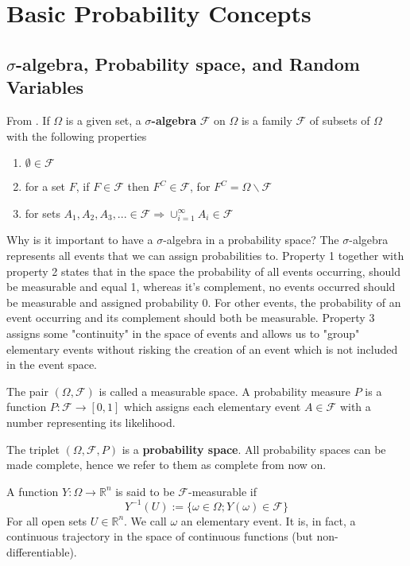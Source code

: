 \documentclass[12pt]{report}
\begin{document}
\tableofcontents
\chapter{Basic Probability Concepts}
\section{$\sigma$-algebra, Probability space, and Random Variables}
From \cite{Oksendal14}. If $\Omega$ is a given set, a \textbf{$\sigma$-algebra} $\mathcal{F}$ on $\Omega$ is a family $\mathcal{F}$ of subsets of $\Omega$ with the following properties
\begin{enumerate}
\item $\emptyset \in \mathcal{F}$
\item for a set $F$, if $F\in \mathcal{F}$ then $F^C\in\mathcal{F}$, for $F^C= \Omega\backslash\mathcal{F}$
\item for sets $A_1,A_2,A_3,...\in\mathcal{F}\Rightarrow \cup_{i=1}^\infty A_i \in \mathcal{F}$
\end{enumerate}
Why is it important to have a $\sigma$-algebra in a probability space?
The $\sigma$-algebra represents all events that we can assign probabilities to. Property 1 together with property 2 states that in the space the probability of all events occurring, should be measurable and equal 1, whereas it's complement, no events occurred should be measurable and assigned probability 0. For other events, the probability of an event occurring and its complement should both be measurable. Property 3 assigns some "continuity" in the space of events and allows us to "group" elementary events without risking the creation of an event which is not included in the event space. 

The pair $(\Omega,\mathcal{F})$ is called a measurable space. A probability measure $P$ is a function $P:\mathcal{F}\rightarrow [0,1]$ which assigns each elementary event $A\in\mathcal{F}$ with a number representing its likelihood. 

The triplet $(\Omega,\mathcal{F},P)$ is a \textbf{probability space}. All probability spaces can be made complete, hence we refer to them as complete from now on. 

A function $Y:\Omega\rightarrow\mathbb{R}^n$ is said to be $\mathcal{F}$-measurable if
\begin{equation*}
Y^{-1}(U):=\{\omega\in \Omega ; Y(\omega)\in \mathcal{F} \}
\end{equation*}
For all open sets $U\in\mathbb{R}^n$. We call $\omega$ an elementary event. It is, in fact, a continuous trajectory in the space of continuous functions (but non-differentiable). 
\end{document}
